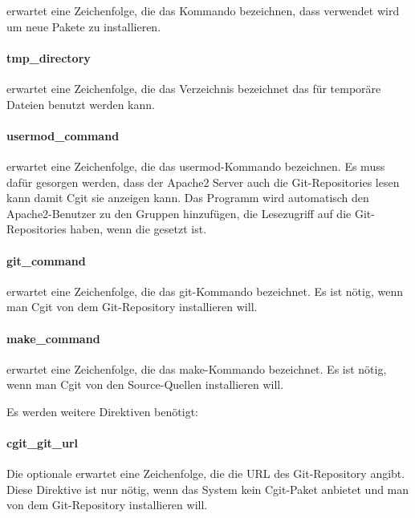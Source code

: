  erwartet eine Zeichenfolge, die das Kommando
bezeichnen, dass verwendet wird um neue Pakete zu installieren.

\paragraph{tmp\_directory}

 erwartet eine Zeichenfolge, die das Verzeichnis bezeichnet
das für temporäre Dateien benutzt werden kann.

\paragraph{usermod\_command}

 erwartet eine Zeichenfolge, die das
usermod-Kommando bezeichnen. Es muss dafür gesorgen werden, dass der Apache2
Server auch die Git-Repositories lesen kann damit Cgit sie anzeigen kann. Das
Programm wird automatisch den Apache2-Benutzer zu den Gruppen hinzufügen, die
Lesezugriff auf die Git-Repositories haben, wenn die
 gesetzt ist.

\paragraph{git\_command}

 erwartet eine Zeichenfolge, die das git-Kommando bezeichnet.
Es ist nötig, wenn man Cgit von dem Git-Repository installieren will.

\paragraph{make\_command}

 erwartet eine Zeichenfolge, die das make-Kommando bezeichnet.
Es ist nötig, wenn man Cgit von den Source-Quellen installieren will.

Es werden weitere Direktiven benötigt:

\paragraph{cgit\_git\_url}

Die optionale  erwartet eine Zeichenfolge, die die URL
des Git-Repository angibt. Diese Direktive ist nur nötig, wenn
das System kein Cgit-Paket anbietet und man von dem Git-Repository installieren will.

